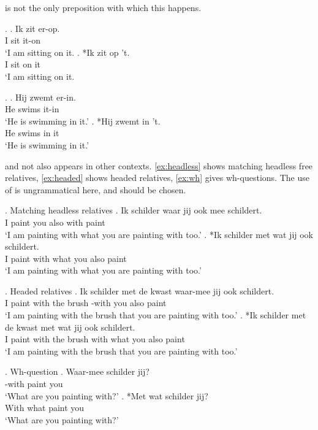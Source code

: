 \documentclass{article}
\begin{document}
 is not the only preposition with which this happens.

\ex.
\ag. Ik zit er-op.\\
 I sit it-on\\
 `I am sitting on it.
\bg. *Ik zit op 't.\\
 I sit on it\\
 `I am sitting on it.

 \ex.
 \ag. Hij zwemt er-in.\\
  He swims it-in\\
  `He is swimming in it.'
 \bg. *Hij zwemt in 't.\\
  He swims in it\\
  `He is swimming in it.'

 and not  also appears in other contexts. \ref{ex:headless} shows matching headless free relatives, \ref{ex:headed} shows headed relatives, \ref{ex:wh} gives wh-questions. The use of  is ungrammatical here, and  should be chosen.

\ex. Matching headless relatives\label{ex:headless}
\ag. Ik schilder waar jij ook mee schildert.\\
 I paint  you also with paint\\
 `I am painting with what you are painting with too.'
\bg. *Ik schilder met wat jij ook schildert.\\
 I paint with what you also paint\\
 `I am painting with what you are painting with too.'

\ex. Headed relatives\label{ex:headed}
\ag. Ik schilder met de kwast waar-mee jij ook schildert.\\
 I paint with the brush -with you also paint\\
 `I am painting with the brush that you are painting with too.'
\bg. *Ik schilder met de kwast met wat jij ook schildert.\\
 I paint with the brush with what you also paint\\
 `I am painting with the brush that you are painting with too.'

\ex. Wh-question\label{ex:wh}
\ag.  Waar-mee schilder jij?\\
 -with paint you\\
 `What are you painting with?'
\bg. *Met wat schilder jij?\\
 With what paint you\\
 `What are you painting with?'
\end{document}
